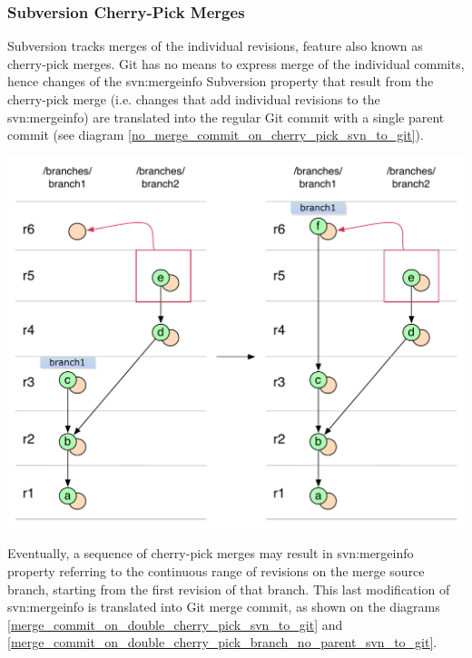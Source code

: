 \subsubsection{Subversion Cherry-Pick Merges}

Subversion tracks merges of the individual revisions, feature also known as cherry-pick merges. 
Git has no means to express merge of the individual commits, hence changes of the svn:mergeinfo Subversion
property that result from the cherry-pick merge (i.e. changes that add individual revisions to the svn:mergeinfo) are
translated into the regular Git commit with a single parent commit (see diagram \ref{no_merge_commit_on_cherry_pick_svn_to_git}).
\begin{center}
\includegraphics[width=\textwidth]{img/diagrams/no_merge_commit_on_cherry_pick_svn_to_git.pdf}%
\label{no_merge_commit_on_cherry_pick_svn_to_git}%
\end{center}

Eventually, a sequence of cherry-pick merges may result in svn:mergeinfo property referring to the 
continuous range of revisions on the merge source branch, starting from the first revision 
of that branch. This last modification of svn:mergeinfo is translated into Git merge commit, as 
shown on the diagrams \ref{merge_commit_on_double_cherry_pick_svn_to_git} and \ref{merge_commit_on_double_cherry_pick_branch_no_parent_svn_to_git}.

